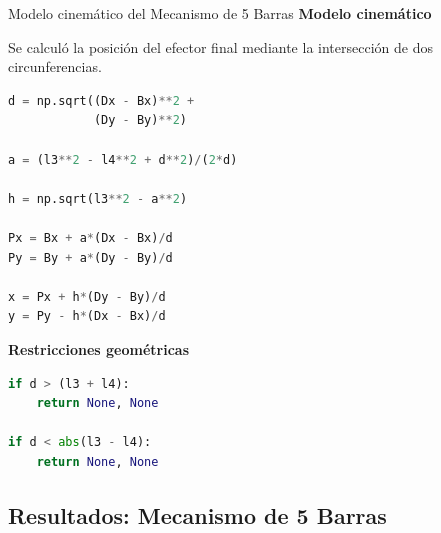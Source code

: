 \documentclass[xcolor={table,dvipsnames}]{beamer}
\begin{document}
\begin{frame}[fragile]{Modelo cinem\'atico del Mecanismo de 5 Barras}
\scriptsize
\textbf{Modelo cinem\'atico}

Se calcul\'o la posici\'on del efector final mediante
la intersecci\'on de dos circunferencias.

\vspace{0.1cm}

\begin{lstlisting}[language=Python,basicstyle=\ttfamily\tiny]
d = np.sqrt((Dx - Bx)**2 +
            (Dy - By)**2)

a = (l3**2 - l4**2 + d**2)/(2*d)

h = np.sqrt(l3**2 - a**2)

Px = Bx + a*(Dx - Bx)/d
Py = By + a*(Dy - By)/d

x = Px + h*(Dy - By)/d
y = Py - h*(Dx - Bx)/d
\end{lstlisting}

\textbf{Restricciones geom\'etricas}

\begin{lstlisting}[language=Python,basicstyle=\ttfamily\tiny]
if d > (l3 + l4):
    return None, None

if d < abs(l3 - l4):
    return None, None
\end{lstlisting}

\end{frame}

\subsection{Resultados: Mecanismo de 5 Barras}
\end{document}

